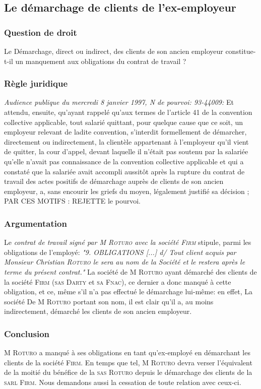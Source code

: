 \subsection{Le démarchage de clients de l'ex-employeur}
\subsubsection{Question de droit}
Le Démarchage, direct ou indirect, des clients de son ancien employeur constitue-t-il un manquement aux obligations du contrat de travail ?
\subsubsection{Règle juridique}
\textit{Audience publique du mercredi 8 janvier 1997, N de pourvoi: 93-44009:}
Et attendu, ensuite, qu'ayant rappelé qu'aux termes de l'article 41 de la convention collective applicable, tout salarié quittant, pour quelque cause que ce soit, un employeur relevant de ladite convention, s'interdit formellement de démarcher, directement ou indirectement, la clientèle appartenant à l'employeur qu'il vient de quitter, la cour d'appel, devant laquelle il n'était pas soutenu par la salariée qu'elle n'avait pas connaissance de la convention collective applicable et qui a constaté que la salariée avait accompli aussitôt après la rupture du contrat de travail des actes positifs de démarchage auprès de clients de son ancien employeur, a, sans encourir les griefs du moyen, légalement justifié sa décision ; PAR CES MOTIFS : REJETTE le pourvoi.
\subsubsection{Argumentation}
Le \textit{contrat de travail signé par M \textsc{Roturo} avec la société \textsc{Firm}} stipule, parmi les obligations de l'employé:
\emph{"9. OBLIGATIONS [...] d/ Tout client acquis par Monsieur Christian \textsc{Roturo} le sera au nom de la Société et le restera après le terme du présent contrat."}
La société de M \textsc{Roturo} ayant démarché des clients de la société \textsc{Firm} (\textsc{sas Darty} et \textsc{sa Fnac}), ce dernier a donc manqué à cette obligation, et ce, même s'il n'a pas effectué le démarchage lui-même:
en effet, La société De M \textsc{Roturo} portant son nom, il est clair qu'il a, au moins indirectement, démarché les clients de son ancien employeur.
\subsubsection{Conclusion}
M \textsc{Roturo} a manqué à ses obligations en tant qu'ex-employé en démarchant les clients de la société \textsc{Firm}. En temps que tel, M \textsc{Roturo} devra verser l'équivalent de la moitié du bénéfice de la \textsc{sas Roturo} depuis le démarchage des clients de la \textsc{sarl Firm}. Nous demandons aussi la cessation de toute relation avec ceux-ci.

